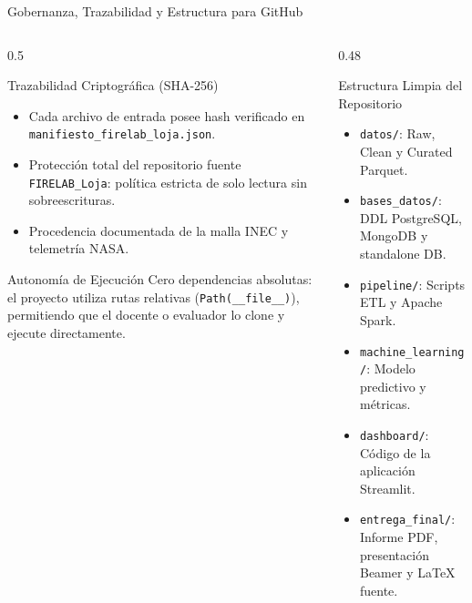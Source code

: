 \documentclass[aspectratio=169,11pt]{beamer}
\newcommand{\seccionactual}{Sustentaci\'on Final}
\begin{document}
\renewcommand{\seccionactual}{Gobernanza \& GitHub}
\begin{frame}{Gobernanza, Trazabilidad y Estructura para GitHub}
  \begin{columns}
    \begin{column}{0.5\textwidth}
      \begin{block}{Trazabilidad Criptogr\'afica (SHA-256)}\scriptsize
        \begin{itemize}
          \item Cada archivo de entrada posee hash verificado en \texttt{manifiesto\_firelab\_loja.json}.
          \item Protecci\'on total del repositorio fuente \texttt{FIRELAB\_Loja}: pol\'itica estricta de solo lectura sin sobreescrituras.
          \item Procedencia documentada de la malla INEC y telemetr\'ia NASA.
        \end{itemize}
      \end{block}
      \vspace{0.8cm}
      \begin{exampleblock}{Autonom\'ia de Ejecuci\'on}\scriptsize
        Cero dependencias absolutas: el proyecto utiliza rutas relativas (\texttt{Path(\_\_file\_\_)}), permitiendo que el docente o evaluador lo clone y ejecute directamente.
      \end{exampleblock}
    \end{column}
    \begin{column}{0.48\textwidth}
      \begin{block}{Estructura Limpia del Repositorio}\scriptsize
        \begin{itemize}
          \item \texttt{datos/}: Raw, Clean y Curated Parquet.
          \item \texttt{bases\_datos/}: DDL PostgreSQL, MongoDB y standalone DB.
          \item \texttt{pipeline/}: Scripts ETL y Apache Spark.
          \item \texttt{machine\_learning/}: Modelo predictivo y m\'etricas.
          \item \texttt{dashboard/}: C\'odigo de la aplicaci\'on Streamlit.
          \item \texttt{entrega\_final/}: Informe PDF, presentaci\'on Beamer y LaTeX fuente.
        \end{itemize}
      \end{block}
    \end{column}
  \end{columns}
\end{frame}
\end{document}
